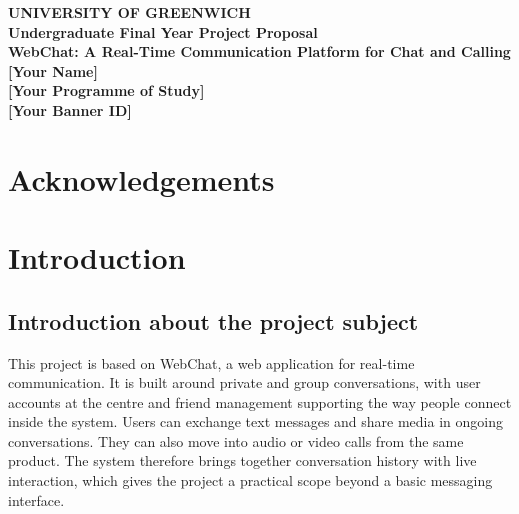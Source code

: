 \documentclass[12pt,a4paper]{article}
\begin{document}
\begin{titlepage}
    \centering
    {\Large \textbf{UNIVERSITY OF GREENWICH}}\\[1cm]
    {\Large \textbf{Undergraduate Final Year Project Proposal}}\\[2cm]
    {\huge \textbf{WebChat: A Real-Time Communication Platform for Chat and Calling}}\\[2cm]
    {\Large \textbf{[Your Name]}}\\[1cm]
    {\large \textbf{[Your Programme of Study]}}\\[0.5cm]
    {\large \textbf{[Your Banner ID]}}\\[2cm]
    \vfill
\end{titlepage}

\clearpage
\section*{Acknowledgements}

\tableofcontents
\clearpage

\section{Introduction}

\subsection{Introduction about the project subject}
This project is based on WebChat, a web application for real-time communication. It is built around private and group conversations, with user accounts at the centre and friend management supporting the way people connect inside the system. Users can exchange text messages and share media in ongoing conversations. They can also move into audio or video calls from the same product. The system therefore brings together conversation history with live interaction, which gives the project a practical scope beyond a basic messaging interface.
\end{document}
